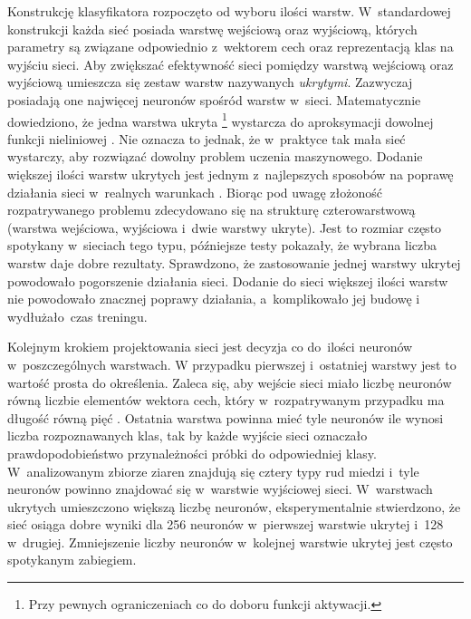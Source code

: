 Konstrukcję klasyfikatora rozpoczęto od wyboru ilości warstw.
W~standardowej konstrukcji każda sieć posiada warstwę wejściową oraz wyjściową,
których parametry są związane odpowiednio z~wektorem cech oraz reprezentacją
klas na wyjściu sieci.
Aby zwiększać efektywność sieci pomiędzy warstwą wejściową oraz wyjściową
umieszcza się zestaw warstw nazywanych \emph{ukrytymi}.
Zazwyczaj posiadają one najwięcej neuronów spośród warstw w~sieci.
Matematycznie dowiedziono, że jedna warstwa ukryta%
\footnote{%
    Przy pewnych ograniczeniach co do doboru funkcji aktywacji.
}
wystarcza do aproksymacji dowolnej funkcji nieliniowej
\cite{cybenko_approximations}.
Nie oznacza to jednak, że w~praktyce tak mała sieć wystarczy, aby rozwiązać
dowolny problem uczenia maszynowego.
Dodanie większej ilości warstw ukrytych jest jednym z~najlepszych sposobów na
poprawę działania sieci w~realnych warunkach \cite[str.~273]{geron_ml}.
Biorąc pod uwagę złożoność rozpatrywanego problemu zdecydowano się na strukturę
czterowarstwową (warstwa wejściowa, wyjściowa i~dwie warstwy ukryte).
Jest to rozmiar często spotykany w~sieciach tego typu, późniejsze testy
pokazały, że wybrana liczba warstw daje dobre rezultaty.
Sprawdzono, że zastosowanie jednej warstwy ukrytej powodowało pogorszenie
działania sieci.
Dodanie do sieci większej ilości warstw nie powodowało znacznej poprawy
działania, a~komplikowało jej budowę i wydłużało~czas treningu.

Kolejnym krokiem projektowania sieci jest decyzja co do~ilości neuronów
w~poszczególnych warstwach.
W przypadku pierwszej i~ostatniej warstwy jest to wartość prosta do określenia.
Zaleca się, aby wejście sieci miało liczbę neuronów równą liczbie elementów
wektora cech, który w~rozpatrywanym przypadku ma długość równą pięć
\cite[str.~272]{geron_ml}.
Ostatnia warstwa powinna mieć tyle neuronów ile wynosi liczba rozpoznawanych
klas, tak by każde wyjście sieci oznaczało prawdopodobieństwo przynależności
próbki do odpowiedniej klasy.
W~analizowanym zbiorze ziaren znajdują się cztery typy rud miedzi i~tyle
neuronów powinno znajdować się w~warstwie wyjściowej sieci.
W~warstwach ukrytych umieszczono większą liczbę neuronów, eksperymentalnie
stwierdzono, że sieć osiąga dobre wyniki dla 256 neuronów w~pierwszej warstwie
ukrytej i~128 w~drugiej.
Zmniejszenie liczby neuronów w~kolejnej warstwie ukrytej jest często spotykanym
zabiegiem.


